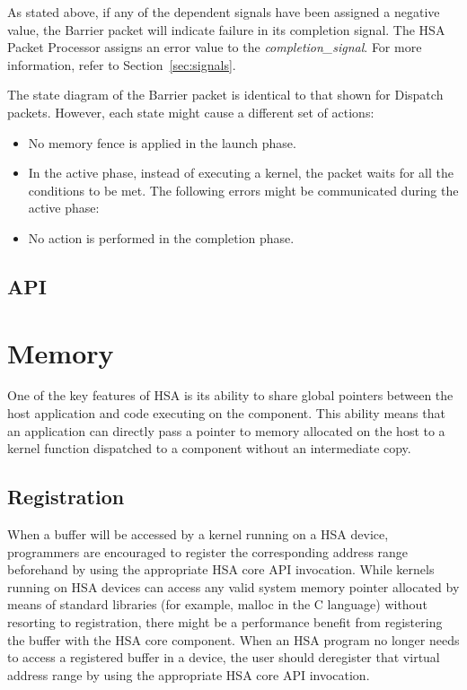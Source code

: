 \documentclass[final]{book}
\newcommand{\reffld}[1]{\textit{#1}}
\begin{document}
As stated above, if any of the dependent signals have been assigned a negative 
value, the Barrier packet will indicate failure in its completion signal. The 
HSA Packet Processor assigns an error value to the \reffld{completion_signal}. 
For more information, refer to Section~\ref{sec:signals}.

The state diagram of the Barrier packet is identical to that shown for Dispatch
packets. However, each state might cause a different set of actions:
\begin{itemize}
\item No memory fence is applied in the launch phase.
\item In the active phase, instead of executing a kernel, the packet waits for
  all the conditions to be met. The following errors might be communicated
  during the active phase: 
\item No action is performed in the completion phase.
\end{itemize}

\subsection{API}


\section{Memory}\label{memory}\hypertarget{memory}{}

One of the key features of HSA is its ability to share global pointers between
the host application and code executing on the component. This ability means
that an application can directly pass a pointer to memory allocated on the host
to a kernel function dispatched to a component without an intermediate copy.

\hypertarget{memory-registration}{}\subsection{Registration}\label{memory-registration}

When a buffer will be accessed by a kernel running on a HSA device, programmers
are encouraged to register the corresponding address range beforehand by using
the appropriate HSA core API invocation. While kernels running on HSA devices
can access any valid system memory pointer allocated by means of standard
libraries (for example, malloc in the C language) without resorting to
registration, there might be a performance benefit from registering the buffer
with the HSA core component. When an HSA program no longer needs to access a
registered buffer in a device, the user should deregister that virtual address
range by using the appropriate HSA core API invocation.
\end{document}
